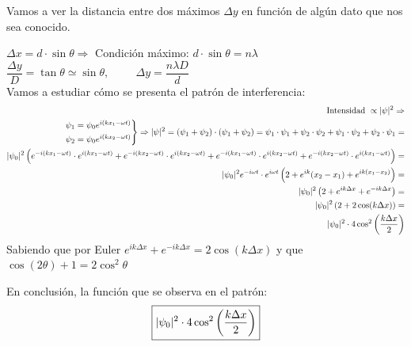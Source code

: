 \documentclass{report}
\begin{document}
    \noindent Vamos a ver la distancia entre dos máximos $\Delta y$ en función de algún dato
    que nos sea conocido.

    \noindent $\Delta x = d\cdot\sin\theta\Rightarrow$ Condición máximo: $\boxed{d\cdot\sin
    \theta=n\lambda}$ \hspace{1.5cm} $\dfrac{\Delta y}{D}=\tan\theta\simeq\sin\theta,\hspace{1cm}
    \boxed{\Delta y=\dfrac{n\lambda D}{d}}$\\

    \vspace{0.4cm}\noindent Vamos a estudiar cómo se presenta el patrón de interferencia:
    \begin{align}
      \begin{split}
        \text{Intensidad }\propto \lvert\psi\rvert^2\Rightarrow\\
        \begin{rcases}
          \psi_1=\psi_0e^{i(kx_1-\omega t)}\\
          \psi_2=\psi_0e^{i(kx_2-\omega t)}
        \end{rcases}
        \Rightarrow\lvert\psi\rvert^2=(\psi_1+\psi_2)\cdot(\psi_1+\psi_2)=\psi_1\cdot\psi_1+\psi_2\cdot
        \psi_2+\psi_1\cdot\psi_2+\psi_2\cdot\psi_1=\\ \lvert\psi_0\rvert^2\left(e^{-i(kx_1-\omega t)}\cdot
        e^{i(kx_1-\omega t)}+e^{-i(kx_2-\omega t)}\cdot e^{i(kx_2-\omega t)}+e^{-i(kx_1-\omega t)}
        \cdot e^{i(kx_2-\omega t)}+e^{-i(kx_2-\omega t)}\cdot e^{i(kx_1-\omega t)}\right)=\\ \lvert
        \psi_0\rvert^2e^{-i\omega t}\cdot e^{i\omega t}\left(2+e^{ik}(x_2-x_1)+e^{ik(x_1-x_2)}\right)=\\
        \lvert\psi_0\rvert^2\left(2+e^{ik\Delta x}+e^{-ik\Delta x}\right)=\\ \lvert\psi_0\rvert^2\left(
        2+2\cos(k\Delta x)\right)=\\ \lvert\psi_0\rvert^2\cdot 4\cos^2\left(\dfrac{k\Delta x}{2}\right)
      \end{split}
    \end{align}
    \noindent Sabiendo que por Euler $e^{ik\Delta x}+e^{-ik\Delta x}=2\cos(k\Delta x)$ y que 
    $\cos(2\theta)+1=2\cos^2\theta$

    \noindent En conclusión, la función que se observa en el patrón:
    \begin{equation}
      \boxed{\lvert\psi_0\rvert^2\cdot4\cos^2\left(\dfrac{k\Delta x}{2}\right)}
      \label{eq:PatronInterferencia}
    \end{equation}
\end{document}
